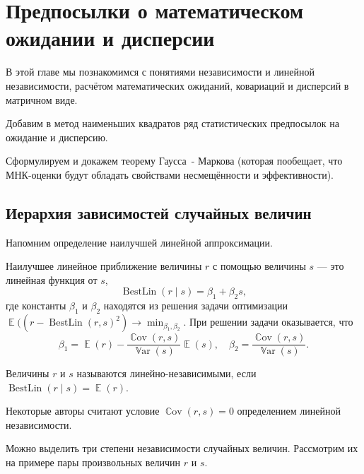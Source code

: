 \documentclass[12pt]{article}
\DeclareMathOperator{\Cov}{\mathbb{C}ov}
\DeclareMathOperator{\Var}{\mathbb{V}ar}
\DeclareMathOperator{\BestLin}{BestLin}
\DeclareMathOperator{\E}{\mathbb{E}}
\begin{document}
\section{Предпосылки о математическом ожидании и дисперсии}
В этой главе мы познакомимся с понятиями независимости и линейной независимости, расчётом математических ожиданий, ковариаций и дисперсий в матричном виде.

Добавим в метод наименьших квадратов ряд статистических предпосылок на ожидание и дисперсию.

Сформулируем и докажем теорему Гаусса~- Маркова (которая пообещает, что МНК-оценки будут обладать свойствами несмещённости и эффективности).

\subsection{Иерархия зависимостей случайных величин}


Напомним определение наилучшей линейной аппроксимации.
\begin{definition}
Наилучшее линейное приближение величины $r$ с помощью величины $s$ — это линейная функция от $s$,
\[
\BestLin(r \mid s) = \beta_1 + \beta_2 s,
\]
где константы $\beta_1$ и $\beta_2$ находятся из решения задачи оптимизации
$\E((r - \BestLin(r, s)^2) \to \min_{\beta_1, \beta_2}$.
При решении задачи оказывается, что
\[
\beta_1 = \E(r) - \frac{\Cov(r, s)}{\Var(s)} \E(s), \quad \beta_2 = \frac{\Cov(r, s)}{\Var(s)}.
\]
\end{definition}

\begin{definition}
Величины $r$ и $s$ называются линейно-независимыми, если $\BestLin(r \mid s) = \E(r)$.
\end{definition}
Некоторые авторы считают условие $\Cov(r, s) = 0$ определением линейной независимости.

Можно выделить три степени независимости случайных величин. 
Рассмотрим их на примере пары произвольных величин $r$ и $s$.
\end{document}
